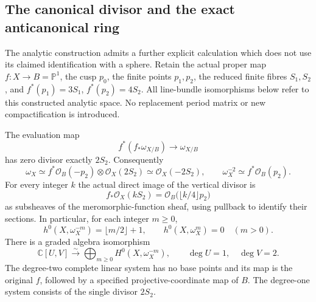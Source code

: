 \subsection{The canonical divisor and the exact anticanonical ring}
\label{wb:sec:canonical-ring-recovery}

The analytic construction admits a further explicit calculation which does
not use its claimed identification with a sphere. Retain the actual proper
map $f:X\to B=\mathbb P^1$, the cusp $p_0$, the finite points $p_1,p_2$,
the reduced finite fibres $S_1,S_2$, and
$f^*(p_1)=3S_1$, $f^*(p_2)=4S_2$. All line-bundle isomorphisms below
refer to this constructed analytic space. No replacement period matrix or
new compactification is introduced.

\begin{theorem}
\label{wb:thm:canonical-ring-recovery}
The evaluation map
\[
 f^*(f_*\omega_{X/B})\longrightarrow\omega_{X/B}
\]
has zero divisor exactly $2S_2$. Consequently
\[
 \omega_X\simeq f^*\mathcal O_B(-p_2)\otimes\mathcal O_X(2S_2)
       \simeq\mathcal O_X(-2S_2),\qquad
 \omega_X^{-2}\simeq f^*\mathcal O_B(p_2).
 \tag{CR1}
\]
For every integer $k$ the actual direct image of the vertical divisor is
\[
 f_*\mathcal O_X(kS_2)
       =\mathcal O_B\bigl(\lfloor k/4\rfloor p_2\bigr)
 \tag{CR2}
\]
as subsheaves of the meromorphic-function sheaf, using pullback to identify
their sections. In particular, for each integer $m\geq0$,
\[
 h^0(X,\omega_X^{-m})=\lfloor m/2\rfloor+1,
 \qquad h^0(X,\omega_X^m)=0\quad(m>0).
 \tag{CR3}
\]
There is a graded algebra isomorphism
\[
 \mathbb C[U,V]\xrightarrow{\sim}
       \bigoplus_{m\geq0}H^0(X,\omega_X^{-m}),
       \qquad\deg U=1,\quad\deg V=2.
 \tag{CR4}
\]
The degree-two complete linear system has no base points and its map is
the original $f$, followed by a specified projective-coordinate map of $B$.
The degree-one system consists of the single divisor $2S_2$.
\end{theorem}

